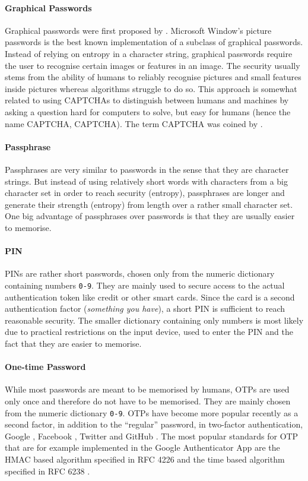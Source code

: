 \paragraph{Graphical Passwords}
Graphical passwords were first proposed by \citet{Blonder96}. 
Microsoft Window's picture passwords \cite{picturepwd1,picturepwd2} is the best known implementation of a subclass of graphical passwords.
Instead of relying on entropy in a character string, graphical passwords require the user to recognise certain images or features in an image.
The security usually stems from the ability of humans to reliably recognise pictures and small features inside pictures whereas algorithms struggle to do so.
This approach is somewhat related to using \acsp{CAPTCHA} to distinguish between humans and machines by asking a question hard for computers to solve, but easy for humans (hence the name \ac{CAPTCHA}, \acl{CAPTCHA}).
The term \ac{CAPTCHA} was coined by \citet{AhnBHL03}.

\paragraph{Passphrase}
Passphrases are very similar to passwords in the sense that they are character strings.
But instead of using relatively short words with characters from a big character set in order to reach security (entropy), passphrases are longer and generate their strength (entropy) from length over a rather small character set.
One big advantage of passphrases over passwords is that they are usually easier to memorise.

\paragraph{\acl{PIN}}
\acp{PIN} are rather short passwords, chosen only from the numeric dictionary containing numbers \texttt{0-9}.
They are mainly used to secure access to the actual authentication token like credit or other smart cards.
Since the card is a second authentication factor (\emph{something you have}), a short \ac{PIN} is sufficient to reach reasonable security.
The smaller dictionary containing only numbers is most likely due to practical restrictions on the input device, used to enter the \ac{PIN} and the fact that they are easier to memorise.

\paragraph{One-time Password}
While most passwords are meant to be memorised by humans, \acp{OTP} are used only once and therefore do not have to be memorised.
They are mainly chosen from the numeric dictionary \texttt{0-9}.
\acp{OTP} have become more popular recently as a second factor, in addition to the ``regular'' password, in two-factor authentication, \eg Google \cite{Google2Factor}, Facebook \cite{FB2Factor}, Twitter \cite{Twitter2Factor} and GitHub \cite{Github2Factor}.
The most popular standards for \ac{OTP} that are for example implemented in the Google Authenticator App \cite{GAuthenticator} are the \acs{HMAC} based algorithm specified in RFC 4226 \cite{rfc4226} and the time based algorithm specified in RFC 6238 \cite{rfc6238}.

